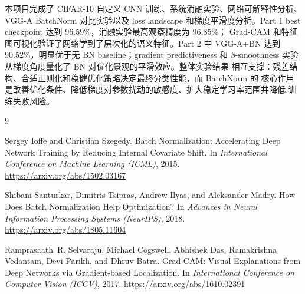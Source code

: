 \documentclass[11pt,a4paper]{ctexart}
\newcommand{\bestPartOneAcc}{96.59\%}
\newcommand{\bestPartOneObservedAcc}{96.85\%}
\newcommand{\bestVggAcc}{90.52\%}
\begin{document}
本项目完成了 CIFAR-10 自定义 CNN 训练、系统消融实验、网络可解释性分析、VGG-A
BatchNorm 对比实验以及 loss landscape 和梯度平滑度分析。Part 1 best checkpoint
达到 \bestPartOneAcc{}，消融实验最高观察精度为 \bestPartOneObservedAcc{}；
Grad-CAM 和特征图可视化验证了网络学到了层次化的语义特征。Part 2 中 VGG-A+BN 达到
\bestVggAcc{}，明显优于无 BN baseline；gradient predictiveness 和
$\beta$-smoothness 实验从梯度角度量化了 BN 对优化景观的平滑效应。整体实验结果
相互支撑：残差结构、合适正则化和稳健优化策略决定最终分类性能，而 BatchNorm 的
核心作用是改善优化条件、降低梯度对参数扰动的敏感度、扩大稳定学习率范围并降低
训练失败风险。

\begin{thebibliography}{9}

Sergey Ioffe and Christian Szegedy.
\newblock Batch Normalization: Accelerating Deep Network Training by Reducing Internal Covariate Shift.
\newblock In \emph{International Conference on Machine Learning (ICML)}, 2015.
\newblock \url{https://arxiv.org/abs/1502.03167}

Shibani Santurkar, Dimitris Tsipras, Andrew Ilyas, and Aleksander Madry.
\newblock How Does Batch Normalization Help Optimization?
\newblock In \emph{Advances in Neural Information Processing Systems (NeurIPS)}, 2018.
\newblock \url{https://arxiv.org/abs/1805.11604}

Ramprasaath~R. Selvaraju, Michael Cogswell, Abhishek Das, Ramakrishna Vedantam,
Devi Parikh, and Dhruv Batra.
\newblock Grad-CAM: Visual Explanations from Deep Networks via Gradient-based
Localization.
\newblock In \emph{International Conference on Computer Vision (ICCV)}, 2017.
\newblock \url{https://arxiv.org/abs/1610.02391}

\end{thebibliography}
\end{document}
